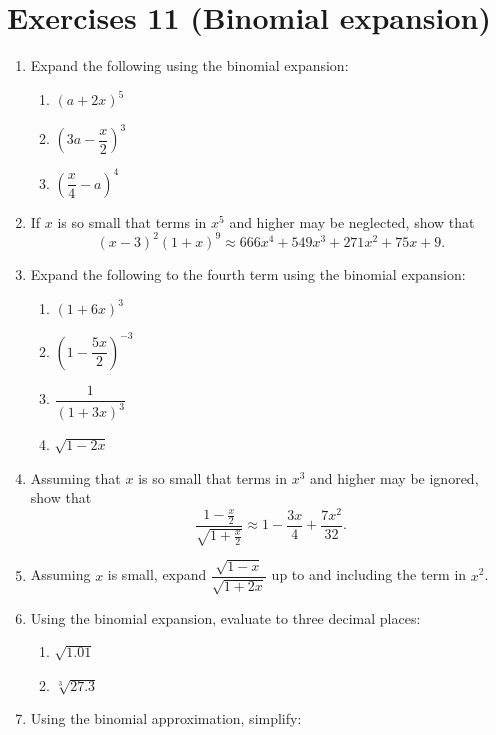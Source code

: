 \documentclass[
  12pt,
  oneside]{book}
\providecommand{\tightlist}{%
  \setlength{\itemsep}{0pt}\setlength{\parskip}{0pt}}
\theoremstyle{definition}
\theoremstyle{definition}
\theoremstyle{definition}
\theoremstyle{definition}
\theoremstyle{remark}
\begin{document}
\hypertarget{exercises-11-binomial-expansion}{%
\chapter*{Exercises 11 (Binomial expansion)}\label{exercises-11-binomial-expansion}}

\begin{enumerate}
\def\labelenumi{\arabic{enumi}.}
\item
  Expand the following using the binomial expansion:

  \begin{enumerate}
  \def\labelenumii{\roman{enumii})}
  \tightlist
  \item
    \((a+2x)^5\)
  \item
    \(\left(3a-\dfrac{x}{2}\right)^3\)
  \item
    \(\left(\dfrac{x}{4}-a\right)^4\)
  \end{enumerate}
\item
  If \(x\) is so small that terms in \(x^5\) and higher may be neglected, show that
  \[(x - 3)^2(1 + x)^9 \approx 666x^4 + 549x^3 + 271x^2 + 75x + 9.\]
\item
  Expand the following to the fourth term using the binomial expansion:

  \begin{enumerate}
  \def\labelenumii{\roman{enumii})}
  \tightlist
  \item
    \((1+6x)^3\)
  \item
    \(\left(1-\dfrac{5x}{2}\right)^{-3}\)
  \item
    \(\dfrac{1}{(1+3x)^3}\)
  \item
    \(\sqrt{1-2x}\)
  \end{enumerate}
\item
  Assuming that \(x\) is so small that terms in \(x^3\) and higher may be ignored, show that
  \[\frac{1-\frac{x}{2}}{\sqrt{1+\frac{x}{2}}}\approx 1-\frac{3x}{4}+\frac{7x^2}{32}.\]
\item
  Assuming \(x\) is small, expand \(\dfrac{\sqrt{1-x}}{\sqrt{1+2x}}\) up to and including the term in \(x^2\).
\item
  Using the binomial expansion, evaluate to three decimal places:

  \begin{enumerate}
  \def\labelenumii{\roman{enumii})}
  \tightlist
  \item
    \(\sqrt{1.01}\)
  \item
    \(\sqrt[3]{27.3}\)
  \end{enumerate}
\item
  Using the binomial approximation, simplify:


\end{enumerate}
\end{document}
